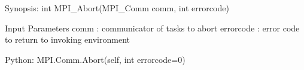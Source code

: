 Synopsis:
int MPI_Abort(MPI_Comm comm, int errorcode)

Input Parameters
comm : communicator of tasks to abort
errorcode : error code to return to invoking environment

Python:
MPI.Comm.Abort(self, int errorcode=0)
